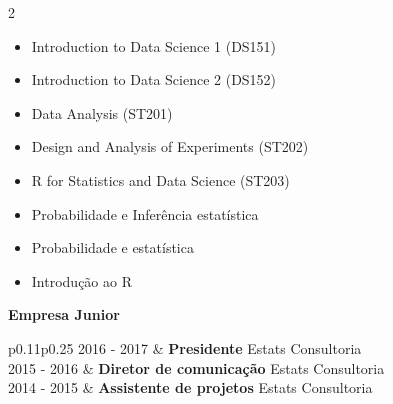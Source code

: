 \documentclass[10pt,a4paper,withhyper]{altacv}
\begin{document}
\begin{paracol}{2}
\divider
{}



\divider \smallskip


\newpage


\begin{itemize}
    \item Introduction to Data Science 1 (DS151)
    \item Introduction to Data Science 2 (DS152)
    \item Data Analysis (ST201)
    \item Design and Analysis of Experiments (ST202)
    \item R for Statistics and Data Science (ST203)
\end{itemize}

\divider
{}
\begin{itemize}
    \item Probabilidade e Inferência estatística
    \item Probabilidade e estatística
\end{itemize}

\divider
{}
\begin{itemize}
    \item Introdução ao R
\end{itemize}


{\large {} \textbf{Empresa Junior}}

\begin{tabular}{{p{0.11\textwidth}p{0.25\textwidth}}}
	2016 - 2017 & \textbf{Presidente} \newline
	Estats Consultoria \\
	2015 - 2016 & \textbf{Diretor de comunicação} \newline
	Estats Consultoria \\
	2014 - 2015 & \textbf{Assistente de projetos} \newline
	Estats Consultoria \\
\end{tabular}

\end{paracol}
\end{document}
